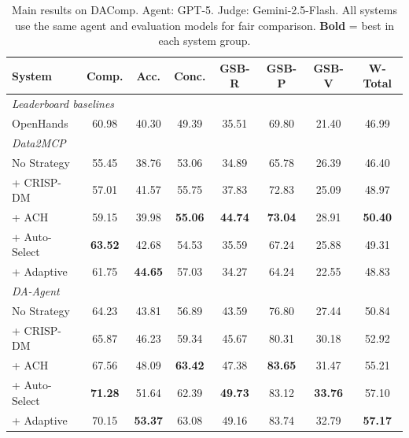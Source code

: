 \begin{table}[!t]
  \caption{Main results on DAComp. Agent: GPT-5. Judge: Gemini-2.5-Flash.
    All systems use the same agent and evaluation models for fair comparison.
    \textbf{Bold} = best in each system group.}
  \label{tab:main}
  \centering
  \setlength{\tabcolsep}{4pt}
  \begin{tabular*}{\textwidth}{@{\extracolsep{\fill}}lccccccc}
    \toprule
    \textbf{System} & \textbf{Comp.} & \textbf{Acc.} & \textbf{Conc.}
      & \textbf{GSB-R} & \textbf{GSB-P} & \textbf{GSB-V} & \textbf{W-Total} \\
    \midrule
    \multicolumn{8}{l}{\textit{Leaderboard baselines}} \\
    OpenHands        & 60.98 & 40.30 & 49.39 & 35.51 & 69.80 & 21.40 & 46.99 \\
    \midrule
    \multicolumn{8}{l}{\textit{Data2MCP}} \\
    No Strategy      & 55.45 & 38.76 & 53.06 & 34.89 & 65.78 & 26.39 & 46.40 \\
    + CRISP-DM       & 57.01 & 41.57 & 55.75 & 37.83 & 72.83 & 25.09 & 48.97 \\
    + ACH            & 59.15 & 39.98 & \textbf{55.06} & \textbf{44.74}
                     & \textbf{73.04} & 28.91 & \textbf{50.40} \\
    + Auto-Select    & \textbf{63.52} & 42.68 & 54.53 & 35.59 & 67.24
                     & 25.88 & 49.31 \\
    + Adaptive       & 61.75 & \textbf{44.65} & 57.03 & 34.27 & 64.24
                     & 22.55 & 48.83 \\
    \midrule
    \multicolumn{8}{l}{\textit{DA-Agent}} \\
    No Strategy      & 64.23 & 43.81 & 56.89 & 43.59 & 76.80 & 27.44 & 50.84 \\
    + CRISP-DM       & 65.87 & 46.23 & 59.34 & 45.67 & 80.31 & 30.18 & 52.92 \\
    + ACH            & 67.56 & 48.09 & \textbf{63.42} & 47.38 & \textbf{83.65}
                     & 31.47 & 55.21 \\
    + Auto-Select    & \textbf{71.28} & 51.64 & 62.39 & \textbf{49.73} & 83.12
                     & \textbf{33.76} & 57.10 \\
    + Adaptive       & 70.15 & \textbf{53.37} & 63.08 & 49.16 & 83.74
                     & 32.79 & \textbf{57.17} \\
    \bottomrule
  \end{tabular*}
\end{table}




